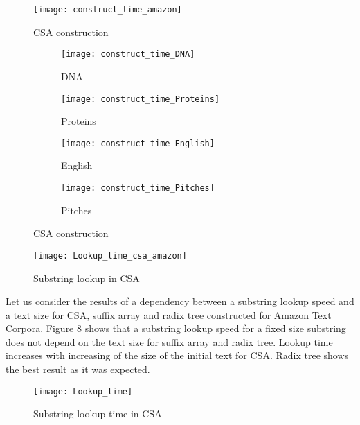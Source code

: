 \begin{figure}[ht!]
	\centering
	\texttt{[image: construct\_time\_amazon]}
	\caption{CSA construction}
	\label{fig:CSA_construct_time_amazon}
\end{figure}

\begin{figure}[ht!]
	\centering
	\begin{subfigure}[b]{0.49\textwidth}
		\centering
		\texttt{[image: construct\_time\_DNA]}
		\caption{DNA}
		\label{fig:y equals x}
	\end{subfigure}
	\hfill
	\begin{subfigure}[b]{0.49\textwidth}
		\centering
		\texttt{[image: construct\_time\_Proteins]}
		\caption{Proteins}
		\label{fig:three sin x proteins}
	\end{subfigure}
	\hfill
	\begin{subfigure}[b]{0.49\textwidth}
		\centering
		\texttt{[image: construct\_time\_English]}
		\caption{English}
		\label{fig:three sin x english}
	\end{subfigure}
	\hfill
	\begin{subfigure}[b]{0.49\textwidth}
		\centering
		\texttt{[image: construct\_time\_Pitches]}
		\caption{Pitches}
		\label{fig:three sin x pitches}
	\end{subfigure}
	\caption{CSA construction}
	\label{fig:three graphs}
\end{figure}

\begin{figure}[ht!]
	\centering
	\texttt{[image: Lookup\_time\_csa\_amazon]}
	\caption{Substring lookup in CSA}
	\label{fig:CSA_Lookup_time_csa_amazon}
\end{figure}

\clearpage
\newpage

Let us consider the results of a dependency between a substring lookup speed and a text size for CSA,
suffix array and radix tree constructed for Amazon Text Corpora. Figure \ref{fig:CSA_Lookup_time}
shows that a substring lookup speed for a fixed size substring does not depend on the text size for
suffix array and radix tree. Lookup time increases with increasing of the size of the initial text for CSA.
Radix tree shows the best result as it was expected.

\begin{figure}[ht!]
	\centering
	\texttt{[image: Lookup\_time]}
	\caption{Substring lookup time in CSA}
	\label{fig:CSA_Lookup_time}
\end{figure}
